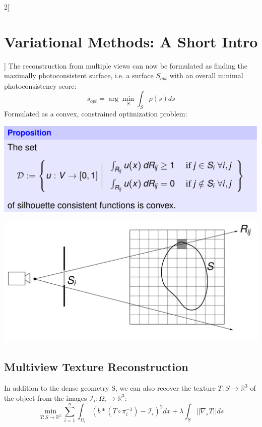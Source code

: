 \documentclass[oneside,fontsize=11pt,paper=a4]{scrartcl}
\newenvironment{myfigure}
  {\par\medskip\noindent\minipage{\linewidth}}
  {\endminipage\par\medskip}
\begin{document}
\begin{multicols}{2}[\section{Variational Methods: A Short Intro}]
The reconstruction from multiple views can now be formulated
as finding the maximally photoconsistent surface, i.e. a surface
$S_{opt}$ with an overall minimal photoconsistency score:
\begin{equation*}
    s_{opt} = \arg \min_S \int_S \rho (s) ds
\end{equation*}
Formulated as a convex, constrained optimization problem:

\begin{myfigure}
 \centering
 \includegraphics[width=1\linewidth]{Images/prop.png}
\end{myfigure}

\begin{myfigure}
 \centering
 \includegraphics[width=1\linewidth]{Images/cam.png}
\end{myfigure}

\subsection{Multiview Texture Reconstruction}
In addition to the dense geometry S, we can also recover the texture $T: S \rightarrow \mathbb{R}^3$ of the object from the images $\mathcal{I}_i : \Omega_i \rightarrow \mathbb{R}^3$:
\begin{equation*}
    \min_{T:S \rightarrow \mathbb{R}^3} \sum_{i=1}^{n} \int_{\Omega_i} (b * (T \circ \pi_i^{-1})- \mathcal{I}_i)^2 dx + \lambda \int_S || \nabla_s T|| ds
\end{equation*}

\end{multicols}
\end{document}
